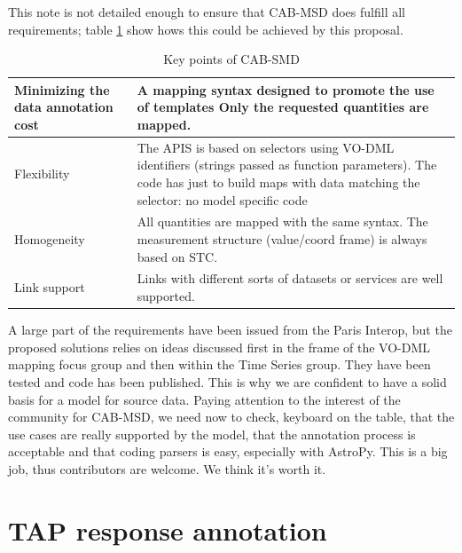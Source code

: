 \documentclass[11pt,a4paper]{ivoa}
\begin{document}
This note is not detailed enough to ensure that  CAB-MSD does fulfill all requirements; table \ref{table:tconclusion} show hows this could be achieved by this proposal.

\begin{table}[!ht]
\begin{tabular}{|p{9em}|p{20em}|}
 \hline
Minimizing the data annotation cost & 
A mapping syntax designed to promote the use of templates
Only the requested quantities are mapped.
\\  
\hline
Flexibility & 
The APIS is based on selectors using VO-DML identifiers (strings passed as function parameters). 
The code has just to build maps with data matching the selector: no model specific code
\\
\hline
Homogeneity & 
All quantities are mapped with the same syntax. The measurement structure (value/coord frame) is always based on STC.
\\  
\hline
Link support &
Links with different sorts of datasets or services are well supported.
\\ 
\hline
\end{tabular}
\caption{Key points of CAB-SMD }
\label{table:tconclusion}
\end{table}

A large part of the requirements have been issued from the Paris Interop, but the proposed solutions relies on ideas discussed first in the frame of the VO-DML mapping focus group and then within the Time Series group. They have been tested and code has been published.
This is why we are confident to have a solid basis for a model for source data. Paying attention to the interest of the community for CAB-MSD, we need now to check, keyboard on the table, that the use cases are really supported by the model, that the annotation process is acceptable and that coding parsers is easy, especially with AstroPy.
This is a big job, thus contributors are welcome. We think it's worth it.

\appendix

\section{TAP response annotation}
\end{document}
